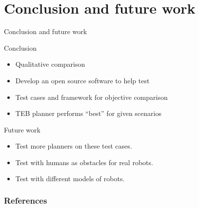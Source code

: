 \documentclass{beamer}
\begin{document}
\section{Conclusion and future work}
\begin{frame}{\huge{Conclusion and future work}}
    \begin{block}{Conclusion}
        \begin{itemize}
            \item Qualitative comparison
            \item Develop an open source software to help test 
            \item Test cases and framework for objective comparison
            \item TEB planner performs ``best'' for given scenarios
        \end{itemize}
    \end{block}
    \begin{block}{Future work}
        \begin{itemize}
            \item Test more planners on these test cases.
            \item Test with humans as obstacles for real robots.
            \item Test with different models of robots.
        \end{itemize}
    \end{block}
\end{frame}

\begin{frame}[allowframebreaks]
    \frametitle{\huge{References}}
    \tiny{ \printbibliography}
\end{frame}
\end{document}
